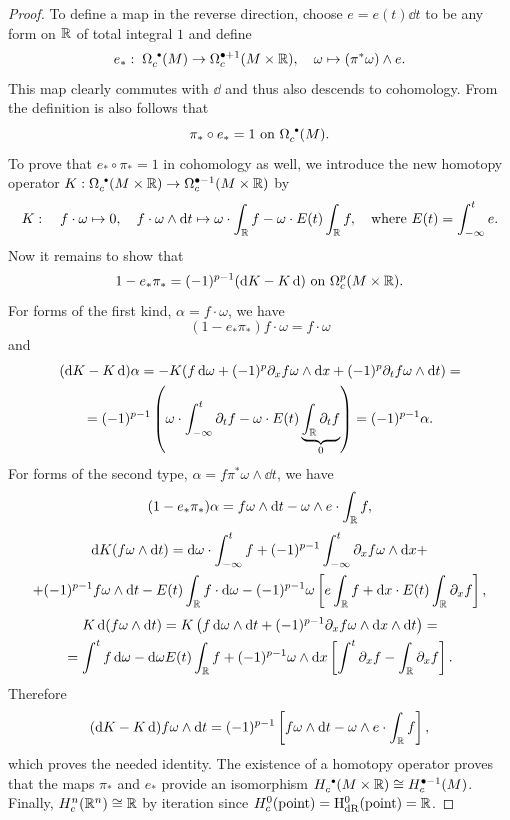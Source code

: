 \begin{proof}
    To define a map in the reverse direction, choose $e=e(t)\dd t$ to be any form on $\mathbb{R}$ of total integral $1$ and define
    \[e_\ast: \; \Omega_c^{\smbullet }(M)\to \Omega_c^{\bullet+1}(M\times\bbR),\quad \omega\mapsto (\pi^\ast \omega)\wedge e.\]
    This map clearly commutes with $\dd$ and thus also descends to cohomology. From the definition is also follows that 
    \[\pi_\ast\circ e_\ast=1 \text{ on }\Omega_c^{\smbullet }(M).\]
    To prove that $e_\ast\circ \pi_\ast=1$ in cohomology as well, we introduce the new homotopy operator $K:\Omega_c^{\smbullet }(M\times\bbR)\to \Omega_c^{\bullet-1}(M\times \bbR)$ by
    \begin{equation}
        K: \quad f\cdot\omega\mapsto 0,    \quad f\cdot \omega\wedge\mathop{}\!\mathrm{d} t\mapsto  \omega\cdot\int_{\mathbb{R}} f-\omega\cdot E(t)\int_{\mathbb{R}} f,\quad \text{where } E(t)=\int_{-\infty}^t e.
    \end{equation}
    Now it remains to show that 
    \[1-e_\ast\pi_\ast=(-1)^{p-1}(\mathop{}\!\mathrm{d} K-K\mathop{}\!\mathrm{d})\text{ on }\Omega_c^p(M\times\mathbb{R}).\]
    For forms of the first kind, $\alpha=f\cdot\omega$, we have
    \[(1-e_\ast\pi_\ast)f\cdot\omega=f\cdot\omega\]
    and
    \begin{multline}
        (\mathop{}\!\mathrm{d} K-K \mathop{}\!\mathrm{d})\alpha=-K(f\mathop{}\!\mathrm{d}\omega+(-1)^p\partial_x f \omega\wedge\mathop{}\!\mathrm{d} x+(-1)^p \partial_t f \omega\wedge\mathop{}\!\mathrm{d} t)
        =\\=(-1)^{p-1}\left(\omega\cdot \int_{-\infty}^t \partial_t f-\omega\cdot E(t) \underbrace{\int_{\mathbb{R}} \partial_t f}_0\right)=(-1)^{p-1}\alpha.
    \end{multline}
    For forms of the second type, $\alpha=f\pi^\ast \omega \wedge \dd t$, we have
    \[(1-e_\ast\pi_\ast)\alpha=f\omega\wedge\mathop{}\!\mathrm{d} t- \omega\wedge e\cdot \int_{\mathbb{R}} f,\]
    \begin{multline}
        \mathop{}\!\mathrm{d} K(f\omega\wedge\mathop{}\!\mathrm{d} t)=\mathop{}\!\mathrm{d}\omega\cdot \int_{-\infty}^t f+(-1)^{p-1}\int_{-\infty}^t \partial_x f\omega \wedge \mathop{}\!\mathrm{d} x+\\+(-1)^{p-1}f\omega\wedge\mathop{}\!\mathrm{d} t-E(t)\int_{\mathbb{R}} f\cdot \mathop{}\!\mathrm{d}\omega-(-1)^{p-1}\omega \left[e\int_{\mathbb{R}} f+\mathop{}\!\mathrm{d} x\cdot E(t)\int_{\mathbb{R}} \partial_x f\right],
    \end{multline}
    \begin{multline}
        K\dd (f\omega\wedge\dd t)=K\left(f\dd \omega\wedge\dd t+(-1)^{p-1}\partial_x f \omega\wedge\dd x\wedge\dd t\right)=\\=\int^t f\dd\omega-\dd\omega E(t)\int_\bbR f+(-1)^{p-1}\omega\wedge\dd x\left[ \int^t\partial_x f- \int_\bbR \partial_x f\right].
    \end{multline}
    Therefore
    \[(\mathop{}\!\mathrm{d} K-K \mathop{}\!\mathrm{d} )f\omega\wedge\mathop{}\!\mathrm{d} t=(-1)^{p-1}\left[f\omega\wedge\mathop{}\!\mathrm{d} t -\omega\wedge e\cdot\int_{\mathbb{R}} f\right],\]
    which proves the needed identity. The existence of a homotopy operator proves that the maps $\pi_\ast$ and $e_\ast$ provide an isomorphism
    $H_c^{\smbullet }(M\times\bbR)\cong H_c^{\bullet -1}(M)$. Finally, 
    $H_c^n(\mathbb{R}^n)\cong \mathbb{R}$ by iteration since $H_c^0(\text{point})=\mathrm{H}_{\rm dR}^0(\text{point})=\mathbb{R}$.
\end{proof}
